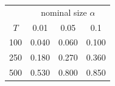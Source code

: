 % 
\begin{tabular}{cccc}
  \hline
  & \multicolumn{3}{c}{nominal size $\alpha$} \\
 $T$ & 0.01 & 0.05 & 0.1 \\
 \hline
100 & 0.040 & 0.060 & 0.100 \\ 
  250 & 0.180 & 0.270 & 0.360 \\ 
  500 & 0.530 & 0.800 & 0.850 \\ 
   \hline
\end{tabular}
